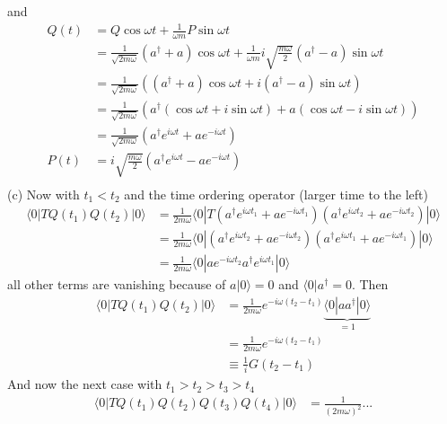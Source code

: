 \documentclass[10pt,a4paper]{article}
\theoremstyle{definition}
\begin{document}
and
\begin{align}
Q(t)&=Q\cos\omega t+\frac{1}{\omega m}P\sin\omega t\\
&=\frac{1}{\sqrt{2m\omega}}(a^\dagger+a)\cos\omega t+\frac{1}{\omega m}i\sqrt{\frac{m\omega}{2}}(a^\dagger-a)\sin\omega t\\
&=\frac{1}{\sqrt{2m\omega}}\left((a^\dagger+a)\cos\omega t+i(a^\dagger-a)\sin\omega t\right)\\
&=\frac{1}{\sqrt{2m\omega}}\left(a^\dagger(\cos\omega t+i\sin\omega t)+a(\cos\omega t-i\sin\omega t) \right)\\
&=\frac{1}{\sqrt{2m\omega}}\left(a^\dagger e^{i\omega t}+a e^{-i\omega t} \right)\\
P(t)&=i\sqrt{\frac{m\omega}{2}}\left(a^\dagger e^{i\omega t}-a e^{-i\omega t} \right)\\
\end{align}
(c) Now with $t_1<t_2$ and the time ordering operator (larger time to the left)
\begin{align}
\langle0|TQ(t_1)Q(t_2)|0\rangle
&=\frac{1}{2m\omega}\langle0|T\left(a^\dagger e^{i\omega t_1}+a e^{-i\omega t_1} \right)\left(a^\dagger e^{i\omega t_2}+a e^{-i\omega t_2} \right)|0\rangle\\
&=\frac{1}{2m\omega}\langle0|\left(a^\dagger e^{i\omega t_2}+a e^{-i\omega t_2} \right)\left(a^\dagger e^{i\omega t_1}+a e^{-i\omega t_1} \right)|0\rangle\\
&=\frac{1}{2m\omega}\langle0|a e^{-i\omega t_2}a^\dagger e^{i\omega t_1}|0\rangle
\end{align}
all other terms are vanishing because of $a|0\rangle=0$ and $\langle0|a^\dagger=0$. Then
\begin{align}
\langle0|TQ(t_1)Q(t_2)|0\rangle
&=\frac{1}{2m\omega}e^{-i\omega (t_2-t_1)}\underbrace{\langle0|a a^\dagger |0\rangle}_{=1}\\
&=\frac{1}{2m\omega}e^{-i\omega (t_2-t_1)}\\
&\equiv\frac{1}{i}G(t_2-t_1)
\end{align}
And now the next case with $t_1>t_2>t_3>t_4$
\begin{align}
\langle0|TQ(t_1)Q(t_2)Q(t_3)Q(t_4)|0\rangle
&=\frac{1}{(2m\omega)^2}...
\end{align}
\end{document}
